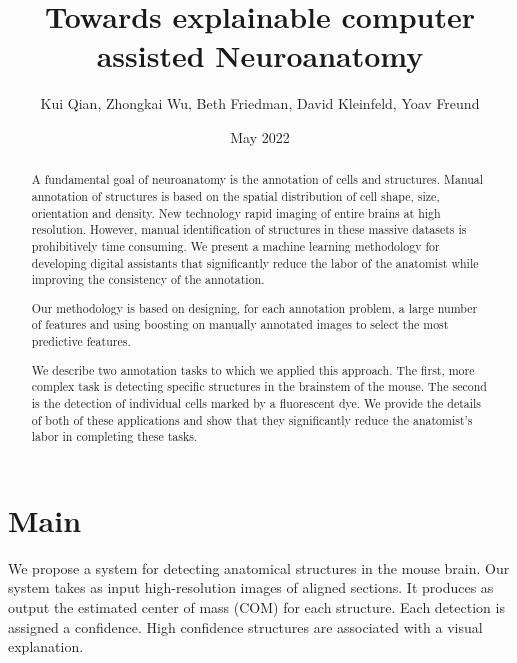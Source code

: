 \documentclass[runningheads]{llncs}
\title{Towards explainable computer assisted Neuroanatomy}
\author{Kui Qian, Zhongkai Wu, Beth Friedman, David Kleinfeld, Yoav Freund}
\date{May 2022}
\begin{document}
\maketitle

\begin{abstract}
  A fundamental goal of neuroanatomy is the annotation of cells and
  structures.  Manual annotation of structures is based on the spatial
  distribution of cell shape, size, orientation and density.  New
  technology rapid imaging of entire brains at high resolution.
  However, manual identification of structures in these massive
  datasets is prohibitively time consuming.  We present a machine
  learning methodology for developing digital assistants that
  significantly reduce the labor of the anatomist while improving the
  consistency of the annotation.

  Our methodology is based on designing, for each annotation problem,
  a large number of features and using boosting on manually annotated
  images to select the most predictive features.

  We describe two annotation tasks to which we applied this approach.
  The first, more complex task is detecting specific structures in the
  brainstem of the mouse. The second is the detection of individual cells marked
  by a fluorescent dye. We provide the details of both of these
  applications and show that they significantly reduce the anatomist's
  labor in completing these tasks.
  
\end{abstract}

\section{Main}
We propose a system for detecting anatomical structures in the mouse
brain. Our system takes as input high-resolution images of aligned
sections. It produces as output the estimated center of mass (COM) for
each structure. Each detection is assigned a confidence. High
confidence structures are associated with a visual explanation.
\end{document}
